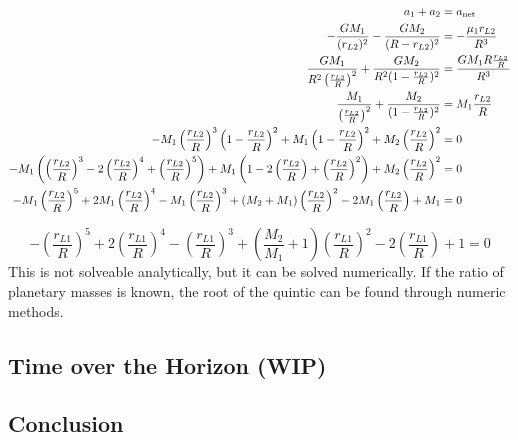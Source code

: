 \documentclass[../basicOrbitalDynamics.tex]{subfiles}
\begin{document}
\begin{align*}
    a_1+a_2&={a}_\text{net}\\
    -\frac{GM_1}{(r_{L2})^2}-\frac{GM_2}{(R-r_{L2})^2} &= -\frac{\mu_1 r_{L2}}{R^3}\\
    \frac{GM_1}{R^2\left(\frac{r_{L2}}{R}\right)^2}+\frac{GM_2}{R^2(1-\frac{r_{L2}}{R})^2} &= \frac{GM_1 R\frac{r_{L2}}{R}}{R^3}\\
    \frac{M_1}{\left(\frac{r_{L2}}{R}\right)^2}+\frac{M_2}{(1-\frac{r_{L2}}{R})^2} &= M_1\frac{r_{L2}}{R}\\
    -M_1\left(\frac{r_{L2}}{R}\right)^3\left(1-\frac{r_{L2}}{R}\right)^2+M_1\left(1-\frac{r_{L2}}{R}\right)^2+M_2\left(\frac{r_{L2}}{R}\right)^2 &= 0\\
    -M_1\left(\left(\frac{r_{L2}}{R}\right)^3-2\left(\frac{r_{L2}}{R}\right)^4+\left(\frac{r_{L2}}{R}\right)^5\right)+M_1\left(1-2\left(\frac{r_{L2}}{R}\right)+\left(\frac{r_{L2}}{R}\right)^2\right)+M_2\left(\frac{r_{L2}}{R}\right)^2 &= 0\\
    -M_1\left(\frac{r_{L2}}{R}\right)^5+2M_1\left(\frac{r_{L2}}{R}\right)^4-M_1\left(\frac{r_{L2}}{R}\right)^3+(M_2+M_1)\left(\frac{r_{L2}}{R}\right)^2-2M_1\left(\frac{r_{L2}}{R}\right)+M_1&= 0\\
\end{align*}

\begin{equation}\label{L2 Equation}
    -\left(\frac{r_{L1}}{R}\right)^5+2\left(\frac{r_{L1}}{R}\right)^4-\left(\frac{r_{L1}}{R}\right)^3+\left(\frac{M_2}{M_1}+1\right)\left(\frac{r_{L1}}{R}\right)^2-2\left(\frac{r_{L1}}{R}\right)+1= 0
\end{equation}
This is not solveable analytically, but it can be solved numerically. If the ratio of planetary masses is known, the root of the quintic can be found through numeric methods. 

\bigskip\bigskip
\subsection{Time over the Horizon (WIP)}


\bigskip\bigskip
\subsection{Conclusion}
\end{document}

